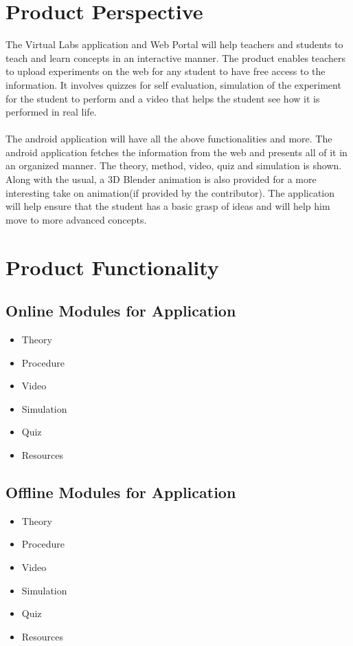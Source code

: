 \documentclass[12pt]{report}
\begin{document}
\section{Product Perspective}
The Virtual Labs application and Web Portal will help teachers and students to teach and learn concepts in an interactive manner. The product enables teachers to upload experiments on the web for any student to have free access to the information. It involves quizzes for self evaluation, simulation of the experiment for the student to perform and a video that helps the student see how it is performed in real life.
\\
\\
The android application will have all the above functionalities and more. The android application fetches the information from the web and presents all of it in an organized manner. The theory, method, video, quiz and simulation is shown. Along with the usual, a 3D Blender animation is also provided for a more interesting take on animation(if provided by the contributor). The application will help ensure that the student has a basic grasp of ideas and will help him move to more advanced concepts.

\section{Product Functionality}
\subsection{Online Modules for Application}
\begin{itemize}
\item Theory
\item Procedure
\item Video
\item Simulation
\item Quiz
\item Resources
\end{itemize}

\subsection{Offline Modules for Application}
\begin{itemize}
\item Theory
\item Procedure
\item Video
\item Simulation
\item Quiz
\item Resources
\end{itemize}
\end{document}
